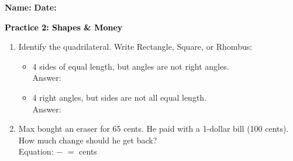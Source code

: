 \documentclass[12pt, letterpaper, fleqn]{article}
\newcommand{\blank}{\underline{\hspace{2.2cm}}}
\begin{document}
\textbf{Name:} \underline{\hspace{5cm}}
\hfill
\textbf{Date:} \underline{\hspace{3cm}}\\

\begin{tcolorbox}[colback=customteal!20]
    \large\textcolor{black}{\textbf{Practice 2: Shapes \& Money}}
\end{tcolorbox}

\vspace{5mm}
\begin{enumerate}[itemsep=3cm, leftmargin=0.6cm]
\item Identify the quadrilateral. Write Rectangle, Square, or Rhombus:
  \begin{itemize}[itemsep=1cm]
    \item 4 sides of equal length, but angles are not right angles. \\ Answer: \blank
    \item 4 right angles, but sides are not all equal length. \\ Answer: \blank
  \end{itemize}

\item Max bought an eraser for 65 cents. He paid with a 1-dollar bill (100 cents). How much change should he get back?
\\
Equation: \blank $-$ \blank $=$ \blank cents
\end{enumerate}
\end{document}

